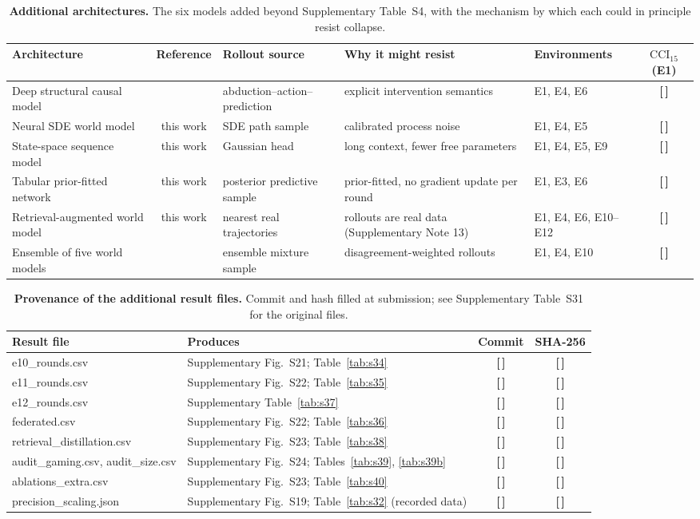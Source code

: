 \documentclass[11pt,a4paper]{article}
\newcommand{\T}{{\color{red}\textbf{[\,]}}}
\newcommand{\CCI}{\mathrm{CCI}}
\begin{document}
\FloatBarrier
\begin{table}[!htbp]\centering\scriptsize
\caption{\textbf{Additional architectures.} The six models added beyond Supplementary Table~S4, with the mechanism by which each could in principle resist collapse.}
\label{tab:s41}
\begin{tabularx}{\textwidth}{@{}p{3.1cm} c p{2.3cm} Y p{2.2cm} c@{}}\toprule
Architecture & Reference & Rollout source & Why it might resist & Environments & $\CCI_{15}$ (E1)\\\midrule
Deep structural causal model & \cite{pawlowski2020scm} & abduction--action--prediction & explicit intervention semantics & E1, E4, E6 & \T\\
Neural SDE world model & this work & SDE path sample & calibrated process noise & E1, E4, E5 & \T\\
State-space sequence model & this work & Gaussian head & long context, fewer free parameters & E1, E4, E5, E9 & \T\\
Tabular prior-fitted network & this work & posterior predictive sample & prior-fitted, no gradient update per round & E1, E3, E6 & \T\\
Retrieval-augmented world model & this work & nearest real trajectories & rollouts are real data (Supplementary Note 13) & E1, E4, E6, E10--E12 & \T\\
Ensemble of five world models & \cite{lakshminarayanan2017ensembles} & ensemble mixture sample & disagreement-weighted rollouts & E1, E4, E10 & \T\\
\bottomrule\end{tabularx}
\end{table}
\FloatBarrier
\begin{table}[!htbp]\centering\footnotesize
\caption{\textbf{Provenance of the additional result files.} Commit and hash filled at submission; see Supplementary Table~S31 for the original files.}
\begin{tabularx}{\textwidth}{@{}Y Y c c@{}}\toprule
Result file & Produces & Commit & SHA-256\\\midrule
e10\_rounds.csv & Supplementary Fig.~S21; Table~\ref{tab:s34} & \T & \T\\
e11\_rounds.csv & Supplementary Fig.~S22; Table~\ref{tab:s35} & \T & \T\\
e12\_rounds.csv & Supplementary Table~\ref{tab:s37} & \T & \T\\
federated.csv & Supplementary Fig.~S22; Table~\ref{tab:s36} & \T & \T\\
retrieval\_distillation.csv & Supplementary Fig.~S23; Table~\ref{tab:s38} & \T & \T\\
audit\_gaming.csv, audit\_size.csv & Supplementary Fig.~S24; Tables~\ref{tab:s39}, \ref{tab:s39b} & \T & \T\\
ablations\_extra.csv & Supplementary Fig.~S23; Table~\ref{tab:s40} & \T & \T\\
precision\_scaling.json & Supplementary Fig.~S19; Table~\ref{tab:s32} (recorded data) & \T & \T\\
\bottomrule\end{tabularx}
\end{table}
\end{document}
